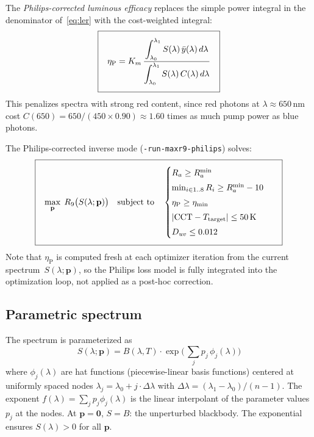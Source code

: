 \documentclass[11pt]{article}
\newcommand{\cmd}[1]{\texttt{#1}}
\begin{document}
The \emph{Philips-corrected luminous efficacy} replaces the simple
power integral in the denominator of~\eqref{eq:ler} with the
cost-weighted integral:
\begin{equation}
\fboxsep=8pt
\boxed{\;
  \eta_{\text{P}} = K_m \,
    \frac{\displaystyle\int_{\lambda_0}^{\lambda_1} S(\lambda)\,\bar{y}(\lambda)\,d\lambda}
         {\displaystyle\int_{\lambda_0}^{\lambda_1} S(\lambda)\,C(\lambda)\,d\lambda}
\;}
  \label{eq:philips-ler}
\end{equation}
This penalizes spectra with strong red content, since red photons at
$\lambda \approx 650\,\text{nm}$ cost $C(650) = 650/(450 \times 0.90)
\approx 1.60$ times as much pump power as blue photons.

\medskip\noindent
The Philips-corrected inverse mode (\cmd{-run-maxr9-philips}) solves:
\begin{equation}
\fboxsep=8pt
\boxed{\;
  \max_{\mathbf{p}} \; R_9\bigl(S(\lambda; \mathbf{p})\bigr)
  \quad \text{subject to} \quad
  \begin{cases}
    R_a \geq R_a^{\min} \\[3pt]
    \min_{i \in 1..8} R_i \geq R_a^{\min} - 10 \\[3pt]
    \eta_{\text{P}} \geq \eta_{\min} \\[3pt]
    |\text{CCT} - T_{\text{target}}| \leq 50\,\text{K} \\[3pt]
    D_{uv} \leq 0.012
  \end{cases}
\;}
  \label{eq:inverse-philips}
\end{equation}
Note that $\eta_{\text{P}}$ is computed fresh at each optimizer
iteration from the current spectrum~$S(\lambda;\mathbf{p})$, so the
Philips loss model is fully integrated into the optimization loop, not
applied as a post-hoc correction.

\subsection{Parametric spectrum}

The spectrum is parameterized as
\begin{equation}
  S(\lambda; \mathbf{p}) =
    B(\lambda, T) \cdot
    \exp\!\biggl(\,
      \sum_{j} p_j \, \phi_j(\lambda)
    \biggr)
  \label{eq:parametric}
\end{equation}
where $\phi_j(\lambda)$ are hat functions (piecewise-linear basis
functions) centered at uniformly spaced nodes
$\lambda_j = \lambda_0 + j \cdot \Delta\lambda$ with
$\Delta\lambda = (\lambda_1 - \lambda_0) / (n-1)$.  The exponent
$f(\lambda) = \sum_j p_j \phi_j(\lambda)$ is the linear interpolant
of the parameter values $p_j$ at the nodes.  At $\mathbf{p} = \mathbf{0}$,
$S = B$: the unperturbed blackbody.  The exponential ensures
$S(\lambda) > 0$ for all $\mathbf{p}$.
\end{document}
